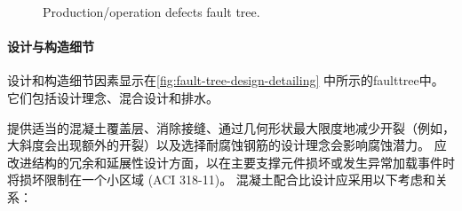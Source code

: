 \begin{figure}
  \caption{Production/operation defects fault tree.}
  \label{fig:fault-tree-production-operation}
\end{figure}

\paragraph{设计与构造细节}
设计和构造细节因素显示在\cref{fig:fault-tree-design-detailing} 中所示的\gls*{faulttree}中。 它们包括设计理念、混合设计和排水。

提供适当的混凝土覆盖层、消除接缝、通过几何形状最大限度地减少开裂（例如，大斜度会出现额外的开裂）以及选择耐腐蚀钢筋的设计理念会影响腐蚀潜力。 应改进结构的冗余和延展性设计方面，以在主要支撑元件损坏或发生异常加载事件时将损坏限制在一个小区域 (ACI 318-11)。 混凝土配合比设计应采用以下考虑和关系：

